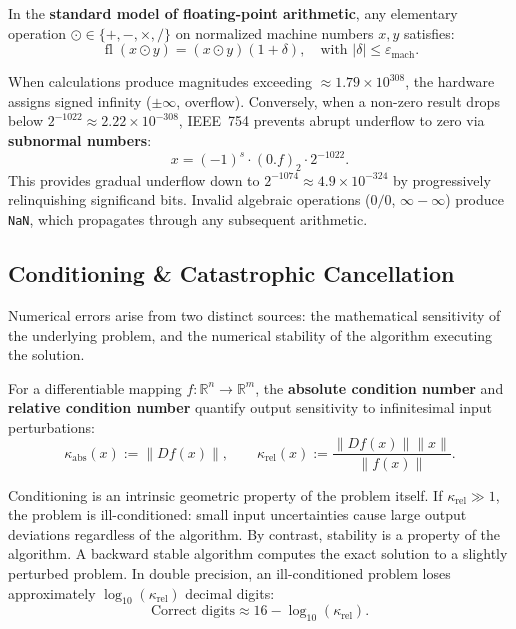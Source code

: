 \begin{theorem}
    In the \textbf{standard model of floating-point arithmetic}, any elementary operation $\odot \in \{+, -, \times, /\}$ on normalized machine numbers $x, y$ satisfies:
    \begin{equation}
        \operatorname{fl}(x \odot y) = (x \odot y)(1 + \delta), \quad \text{with } |\delta| \le \varepsilon_{\text{mach}}.
    \end{equation}
\end{theorem}

When calculations produce magnitudes exceeding $\approx 1.79 \times 10^{308}$, the hardware assigns signed infinity ($\pm \infty$, overflow). Conversely, when a non-zero result drops below $2^{-1022} \approx 2.22 \times 10^{-308}$, IEEE~754 prevents abrupt underflow to zero via \textbf{subnormal numbers}:
\begin{equation}
    x = (-1)^s \cdot (0.f)_2 \cdot 2^{-1022}.
\end{equation}
This provides gradual underflow down to $2^{-1074} \approx 4.9 \times 10^{-324}$ by progressively relinquishing significand bits. Invalid algebraic operations ($0/0$, $\infty - \infty$) produce \texttt{NaN}, which propagates through any subsequent arithmetic.

\subsection{Conditioning \& Catastrophic Cancellation}

Numerical errors arise from two distinct sources: the mathematical sensitivity of the underlying problem, and the numerical stability of the algorithm executing the solution.

\begin{definition}
    For a differentiable mapping $f: \mathbb{R}^n \to \mathbb{R}^m$, the \textbf{absolute condition number} and \textbf{relative condition number} quantify output sensitivity to infinitesimal input perturbations:
    \begin{equation}
        \kappa_{\text{abs}}(x) := \|Df(x)\|, \qquad \kappa_{\text{rel}}(x) := \frac{\|Df(x)\| \|x\|}{\|f(x)\|}.
    \end{equation}
\end{definition}

Conditioning is an intrinsic geometric property of the problem itself. If $\kappa_{\text{rel}} \gg 1$, the problem is ill-conditioned: small input uncertainties cause large output deviations regardless of the algorithm. By contrast, stability is a property of the algorithm. A backward stable algorithm computes the exact solution to a slightly perturbed problem. In double precision, an ill-conditioned problem loses approximately $\log_{10}(\kappa_{\text{rel}})$ decimal digits:
\begin{equation}
    \text{Correct digits} \approx 16 - \log_{10}(\kappa_{\text{rel}}).
\end{equation}


